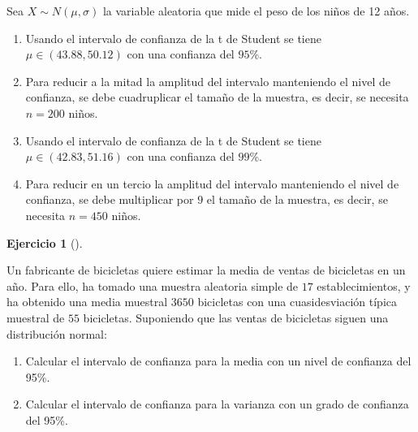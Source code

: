 \documentclass[
  spanish,
  a4paper,
]{scrreport}
\theoremstyle{definition}
\newtheorem{exercise}{Ejercicio}[chapter]
\theoremstyle{remark}
\begin{document}
\begin{tcolorbox}[enhanced jigsaw, arc=.35mm, bottomrule=.15mm, bottomtitle=1mm, breakable, colback=white, colbacktitle=quarto-callout-tip-color!10!white, colframe=quarto-callout-tip-color-frame, coltitle=black, left=2mm, leftrule=.75mm, opacityback=0, opacitybacktitle=0.6, rightrule=.15mm, title=\textcolor{quarto-callout-tip-color}{\faLightbulb}\hspace{0.5em}{Solución}, titlerule=0mm, toprule=.15mm, toptitle=1mm]

Sea \(X\sim N(\mu,\sigma)\) la variable aleatoria que mide el peso de
los niños de 12 años.

\begin{enumerate}
\def\labelenumi{\alph{enumi}.}
\item
  Usando el intervalo de confianza de la t de Student se tiene
  \(\mu \in (43.88, 50.12)\) con una confianza del \(95\)\%.
\item
  Para reducir a la mitad la amplitud del intervalo manteniendo el nivel
  de confianza, se debe cuadruplicar el tamaño de la muestra, es decir,
  se necesita \(n=200\) niños.
\item
  Usando el intervalo de confianza de la t de Student se tiene
  \(\mu \in (42.83, 51.16)\) con una confianza del \(99\)\%.
\item
  Para reducir en un tercio la amplitud del intervalo manteniendo el
  nivel de confianza, se debe multiplicar por \(9\) el tamaño de la
  muestra, es decir, se necesita \(n=450\) niños.
\end{enumerate}

\end{tcolorbox}

\begin{exercise}[]\protect\hypertarget{exr-intervalo-confianza-media-ventas-bicicletas}{}\label{exr-intervalo-confianza-media-ventas-bicicletas}

Un fabricante de bicicletas quiere estimar la media de ventas de
bicicletas en un año. Para ello, ha tomado una muestra aleatoria simple
de \(17\) establecimientos, y ha obtenido una media muestral \(3650\)
bicicletas con una cuasidesviación típica muestral de \(55\) bicicletas.
Suponiendo que las ventas de bicicletas siguen una distribución normal:

\begin{enumerate}
\def\labelenumi{\alph{enumi}.}
\item
  Calcular el intervalo de confianza para la media con un nivel de
  confianza del 95\%.
\item
  Calcular el intervalo de confianza para la varianza con un grado de
  confianza del 95\%.
\end{enumerate}

\end{exercise}
\end{document}
